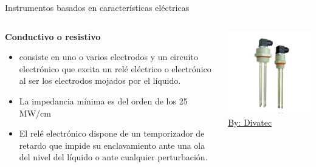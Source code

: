 \documentclass[aspectratio=169]{beamer}
\begin{document}
\begin{frame}{Instrumentos basados en características eléctricas}
    \begin{columns}[c, onlytextwidth]
        \begin{column}{0.5\textwidth}
        \textbf{Conductivo o resistivo}
            \begin{itemize}
                \item consiste en uno o varios electrodos y un circuito electrónico que excita un relé eléctrico o electrónico al ser los electrodos mojados por el líquido.
                \item La impedancia mínima es del orden de los 25 MW/cm
                \item El relé electrónico dispone de un temporizador de retardo que impide su enclavamiento ante una ola del nivel del líquido o ante cualquier perturbación.
            \end{itemize}
        \end{column}
        \begin{column}{0.50\textwidth}
        \centering
            \includegraphics[width = 1.1\linewidth]{fig/Nivel/Resistivo.jpg}           \tiny{\href{http://www.divatecsl.com/productos/interruptor-nivel-conductivo-cfp/}{By: Divatec}}
           
        \end{column}
    \end{columns}
\end{frame}
\end{document}
